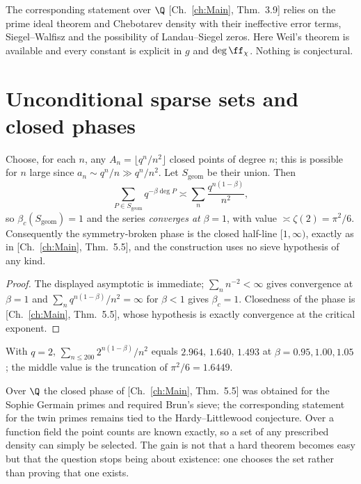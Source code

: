 \begin{remark}\label{XVII:rem:gain}
The corresponding statement over $\Q$ [Ch.~\ref{ch:Main}, Thm.~3.9] relies on the prime ideal theorem
and Chebotarev density with their ineffective error terms, Siegel--Walfisz and the possibility
of Landau--Siegel zeros. Here Weil's theorem is available and every constant is explicit in
$g$ and $\deg\ff_\chi$. Nothing is conjectural.
\end{remark}

\section{Unconditional sparse sets and closed phases}

\begin{theorem}\label{XVII:thm:sparse}
Choose, for each $n$, any $A_n=\lfloor q^n/n^2\rfloor$ closed points of degree $n$; this is
possible for $n$ large since $a_n\sim q^n/n\gg q^n/n^2$. Let $S_{\mathrm{geom}}$ be their
union. Then
\[
\sum_{P\in S_{\mathrm{geom}}}q^{-\beta\deg P}\asymp\sum_n\frac{q^{n(1-\beta)}}{n^2},
\]
so $\beta_c(S_{\mathrm{geom}})=1$ and the series \emph{converges at} $\beta=1$, with value
$\asymp\zeta(2)=\pi^2/6$. Consequently the symmetry-broken phase is the closed half-line
$[1,\infty)$, exactly as in [Ch.~\ref{ch:Main}, Thm.~5.5], and the construction uses no sieve
hypothesis of any kind.
\end{theorem}

\begin{proof}
The displayed asymptotic is immediate; $\sum_nn^{-2}<\infty$ gives convergence at $\beta=1$
and $\sum_nq^{n(1-\beta)}/n^2=\infty$ for $\beta<1$ gives $\beta_c=1$. Closedness of the
phase is [Ch.~\ref{ch:Main}, Thm.~5.5], whose hypothesis is exactly convergence at the critical
exponent.
\end{proof}

\begin{remark}\label{XVII:rem:numsparse}
With $q=2$, $\sum_{n\le200}2^{n(1-\beta)}/n^2$ equals $2.964$, $1.640$, $1.493$ at
$\beta=0.95,1.00,1.05$; the middle value is the truncation of $\pi^2/6=1.6449$.
\end{remark}

\begin{remark}[Comparison]\label{XVII:rem:compare}
Over $\Q$ the closed phase of [Ch.~\ref{ch:Main}, Thm.~5.5] was obtained for the Sophie Germain
primes and required Brun's sieve; the corresponding statement for the twin primes remains
tied to the Hardy--Littlewood conjecture. Over a function field the point counts are known
exactly, so a set of any prescribed density can simply be selected. The gain is not that a
hard theorem becomes easy but that the question stops being about existence: one chooses the
set rather than proving that one exists.
\end{remark}

